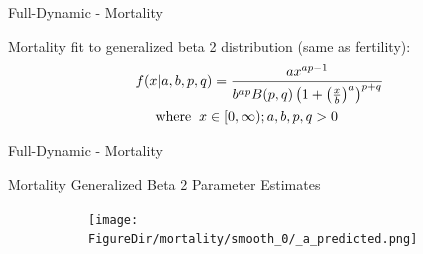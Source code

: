 \documentclass[12pt]{beamer}
\newcommand*{\FigureDir}{../graphs}
\begin{document}
\begin{frame}{Full-Dynamic - Mortality}

	Mortality fit to generalized beta 2 distribution (same as fertility):
	\begin{align*}
		&f(x|a, b, p, q) = \frac{ax^{ap-1}}{b^{ap}B(p,q)\left(1 + \left(\frac{x}{b}\right)^a\right)^{p+q}} \\
		&\hspace{5mm} \text{where} \hspace{2mm} x \in [0,\infty); a, b, p, q > 0   
	 \end{align*}

\end{frame}

\begin{frame}{Full-Dynamic - Mortality}

	\centering
	Mortality Generalized Beta 2 Parameter Estimates
	\vspace{-5mm}
	\begin{table}[H]
	\begin{minipage}[t]{0.33\textwidth}
		\begin{figure}[H]
			\begin{subfigure}{\textwidth}
				\centering
				\texttt{[image: \\FigureDir/mortality/smooth\_0/\_a\_predicted.png]}
				\vspace{-3mm}
				\\ 
			\end{subfigure}


\end{figure}
\end{minipage}
\end{table}
\end{frame}
\end{document}
